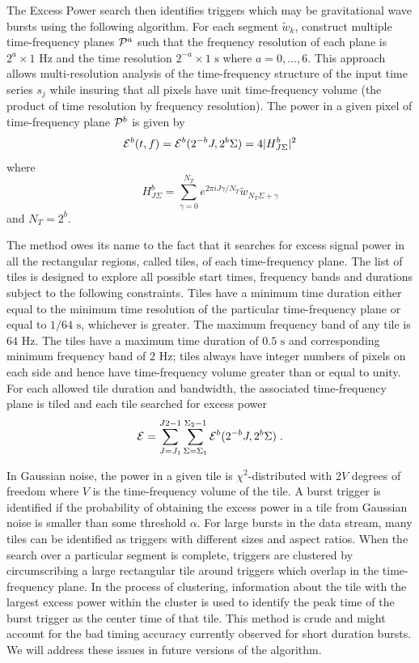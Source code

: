 The Excess Power search then identifies triggers which may be
gravitational wave bursts using the following algorithm.  For each
segment $\tilde{w}_k$,  construct multiple time-frequency planes
${\cal{P}}^a$ such that the frequency resolution of each plane is
$2^a \times 1 \textrm{ Hz}$ and the time resolution $2^{-a} \times 1
\textrm{ s}$ where $a=0,\ldots ,6$.  This approach allows
multi-resolution analysis of the time-frequency structure of the input
time series $s_j$ while insuring that all pixels have unit
time-frequency volume (the product of time resolution by frequency
resolution).   The power in a given pixel of time-frequency plane
${\cal{P}}^b$ is given by
\begin{equation}
{\cal E}^b(t,f) = {\cal E}^b( 2^{-b} J, 2^b \Sigma ) = 4 | H^b_{J\Sigma} |^2
\end{equation}
where 
\begin{equation}
H^b_{J\Sigma} = \sum_{\gamma=0}^{N_T} e^{ 2 \pi i J \gamma / N_T }
\tilde{w}_{N_T \Sigma + \gamma}
\end{equation}
and $N_T = 2^b$.

The method owes its name to the fact that it searches for excess
signal power in all the rectangular regions, called tiles, of each
time-frequency plane.  The list of tiles is designed to explore all
possible start times, frequency bands and durations subject to the
following constraints.  Tiles have a minimum time duration either
equal to the minimum time resolution of the particular time-frequency
plane or equal to $1/64 \textrm{ s}$,  whichever is greater.  The
maximum frequency band of any tile is $64 \textrm{ Hz}$.  The tiles
have a maximum time duration of $0.5 \textrm{ s}$ and corresponding
minimum frequency band of $2 \textrm{ Hz}$;  tiles always have integer
numbers of pixels on each side and hence have time-frequency volume
greater than or equal to unity.  For each allowed tile duration and
bandwidth,  the associated time-frequency plane is tiled and each tile
searched for excess power
\begin{equation}
{\cal{E}} = \sum_{J=J_1}^{J2-1} \sum_{\Sigma=\Sigma_1}^{\Sigma_2-1}
{\cal E}^b( 2^{-b} J , 2^b \Sigma ) \;.
\end{equation}

In Gaussian noise,  the power in a given tile is $\chi^2$-distributed
with $2 V$ degrees of freedom where $V$ is the time-frequency volume
of the tile.    A burst trigger is identified if the probability of
obtaining the excess power in a tile from Gaussian noise is smaller
than some threshold $\alpha$.   For large bursts in the data stream,
many tiles can be identified as triggers with different sizes and
aspect ratios.   When the search over a particular segment is
complete,   triggers are clustered by circumscribing a large
rectangular tile around triggers which overlap in the time-frequency
plane.    In the process of clustering,  information about the tile
with the largest excess power within the cluster is used to identify
the peak time of the burst trigger as the center time of that tile.
This method is crude and might account for the bad timing accuracy
currently observed for short duration bursts.  We will address these
issues in future versions of the algorithm.

